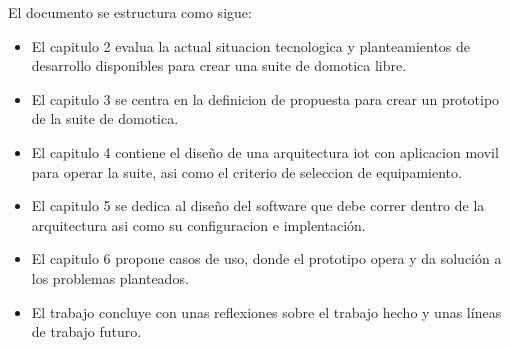 El documento se estructura como sigue:

\begin{itemize}
  \item El capitulo 2 evalua la actual situacion tecnologica y planteamientos de desarrollo disponibles para crear una suite de domotica libre.

  \item El capitulo 3 se centra en la definicion de propuesta para crear un prototipo de la suite de domotica.

  \item El capitulo 4 contiene el diseño de una arquitectura \gls{iot} con aplicacion movil para operar la suite, asi como el criterio de seleccion de equipamiento.

  \item El capitulo 5 se dedica al diseño del software que debe correr dentro de la arquitectura asi como su configuracion e implentación.

  \item El capitulo 6 propone casos de uso, donde el prototipo opera y da solución a los problemas planteados.

  \item El trabajo concluye con unas reflexiones sobre el trabajo hecho y unas líneas de trabajo futuro.
\end{itemize}
